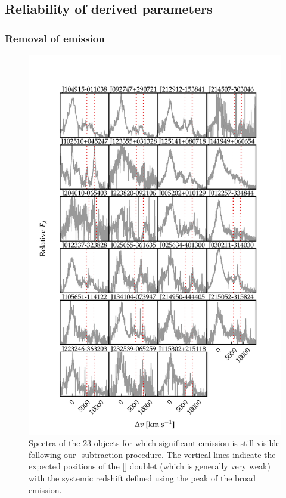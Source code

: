 \subsection{Reliability of derived parameters}

\subsubsection{Removal of  emission}

\begin{figure}
    \centering
    \includegraphics[width=\columnwidth]{figures/chapter04/example_spectrum_grid_extreme_fe.pdf} 
    \caption{Spectra of the 23 objects for which significant  emission is still visible following our -subtraction procedure. The vertical lines indicate the expected positions of the [] doublet (which is generally very weak) with the systemic redshift defined using the peak of the broad \hb emission.}     
    \label{fig:bad_fe}
\end{figure}

